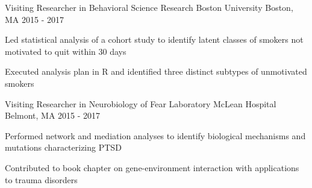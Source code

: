 \begin{cventries}
  \cventry
    {Visiting Researcher in Behavioral Science Research} %
    {Boston University} %
    {Boston, MA} %
    {2015 - 2017} %
    {
      \begin{cvitems} %
        \item {Led statistical analysis of a cohort study to identify latent classes of smokers not motivated to quit within 30 days}
        \item {Executed analysis plan in R and identified three distinct subtypes of unmotivated smokers}
      \end{cvitems}
    }

\cventry
{Visiting Researcher in Neurobiology of Fear Laboratory} %
{McLean Hospital} %
{Belmont, MA} %
{2015 - 2017} %
{
	\begin{cvitems} %
		\item {Performed network and mediation analyses  to identify biological mechanisms and mutations  characterizing PTSD}
		\item {Contributed to book chapter on gene-environment interaction with applications to trauma disorders}
	\end{cvitems}
}

\end{cventries}
